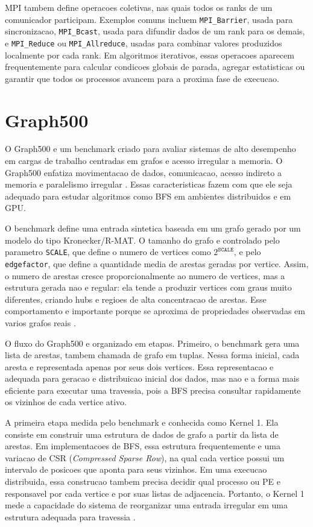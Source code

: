 \documentclass{article}
\begin{document}
MPI tambem define operacoes coletivas, nas quais todos os ranks de um
comunicador participam. Exemplos comuns incluem \texttt{MPI\_Barrier}, usada
para sincronizacao, \texttt{MPI\_Bcast}, usada para difundir dados de um rank
para os demais, e \texttt{MPI\_Reduce} ou \texttt{MPI\_Allreduce}, usadas para
combinar valores produzidos localmente por cada rank. Em algoritmos iterativos,
essas operacoes aparecem frequentemente para calcular condicoes globais de
parada, agregar estatisticas ou garantir que todos os processos avancem para a
proxima fase de execucao.

\section{Graph500}
O Graph500 e um benchmark criado para avaliar sistemas de alto desempenho em
cargas de trabalho centradas em grafos e acesso irregular a memoria. O Graph500 
enfatiza movimentacao de dados, comunicacao, acesso indireto a memoria e 
paralelismo irregular \cite{murphygraph500}. Essas caracteristicas 
fazem com que ele seja adequado para estudar algoritmos como BFS em ambientes 
distribuidos e em GPU.

O benchmark define uma entrada sintetica baseada em um grafo gerado por um
modelo do tipo Kronecker/R-MAT. O tamanho do grafo e controlado pelo parametro
\texttt{SCALE}, que define o numero de vertices como $2^{\texttt{SCALE}}$, e
pelo \texttt{edgefactor}, que define a quantidade media de arestas geradas por
vertice. Assim, o numero de arestas cresce proporcionalmente ao numero de
vertices, mas a estrutura gerada nao e regular: ela tende a produzir vertices
com graus muito diferentes, criando hubs e regioes de alta concentracao de
arestas. Esse comportamento e importante porque se aproxima de propriedades
observadas em varios grafos reais \cite{graph500spec}.

O fluxo do Graph500 e organizado em etapas. Primeiro, o benchmark gera uma lista
de arestas, tambem chamada de grafo em tuplas. Nessa forma inicial, cada aresta
e representada apenas por seus dois vertices. Essa representacao e adequada para
geracao e distribuicao inicial dos dados, mas nao e a forma mais eficiente para
executar uma travessia, pois a BFS precisa consultar rapidamente os vizinhos de
cada vertice ativo.

A primeira etapa medida pelo benchmark e conhecida como Kernel 1. Ela consiste
em construir uma estrutura de dados de grafo a partir da lista de arestas. Em
implementacoes de BFS, essa estrutura frequentemente e uma variacao de CSR
(\textit{Compressed Sparse Row}), na qual cada vertice possui um intervalo de
posicoes que aponta para seus vizinhos. Em uma execucao distribuida, essa
construcao tambem precisa decidir qual processo ou PE e responsavel por cada
vertice e por suas listas de adjacencia. Portanto, o Kernel 1 mede a capacidade
do sistema de reorganizar uma entrada irregular em uma estrutura adequada para
travessia \cite{graph500spec}.
\end{document}
